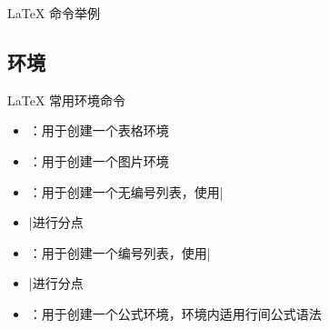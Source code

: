 \begin{frame}{\LaTeX{} 命令举例}
    \vspace{-40pt}
\end{frame}

\subsection{环境}
\begin{frame}[fragile]{\LaTeX{} 常用环境命令}
    \begin{itemize}
        \item {}：用于创建一个表格环境
        \item {}：用于创建一个图片环境
        \item {}：用于创建一个无编号列表，使用|\item|进行分点
        \item {}：用于创建一个编号列表，使用|\item|进行分点
        \item {}：用于创建一个公式环境，环境内适用行间公式语法
    \end{itemize}
\end{frame}

